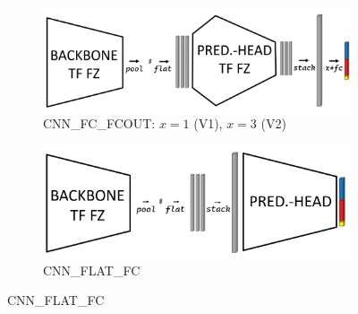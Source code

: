 \begin{figure}[H]
    \vspace{0.5cm} %

    \begin{subfigure}[b]{0.48\textwidth}
        \centering
        \includegraphics[width=\textwidth]{PICs/temporalModels/CNN_FC_FCOUT_V1_V2.jpg}
        \caption{CNN\_FC\_FCOUT: $x=1$ (V1), $x=3$ (V2)}
        \label{fig:temporalModels_e}
    \end{subfigure}
    \hfill
    \begin{subfigure}[b]{0.48\textwidth}
        \centering
        \includegraphics[width=\textwidth]{PICs/temporalModels/CNN_FLAT_FC.jpg}
        \caption{CNN\_FLAT\_FC}
    \end{subfigure}


\end{figure}
